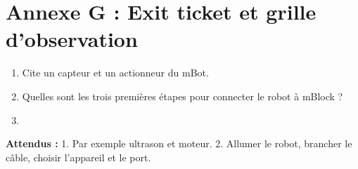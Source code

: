 \documentclass[11pt,a4paper]{article}
\begin{document}
\section*{Annexe G : Exit ticket et grille d'observation}

\begin{enumerate}
 \item Cite un capteur et un actionneur du mBot.\\ \lig
 \item Quelles sont les trois premières étapes pour connecter le robot à mBlock ?\\ \lig
 \item \autoeval
\end{enumerate}
\textbf{Attendus :} 1. Par exemple ultrason et moteur. 2. Allumer le robot, brancher le câble, choisir l'appareil et le port.

\bigskip
{}
\end{document}
